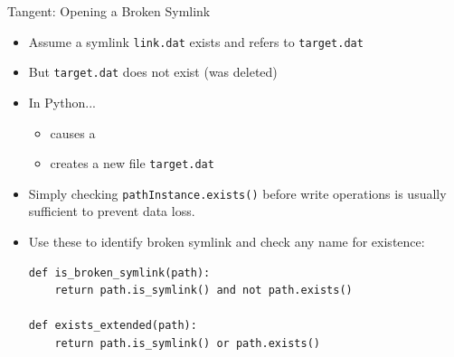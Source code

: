 \begin{frame}[fragile]{Tangent: Opening a Broken Symlink}
%
\begin{itemize}
\item Assume a symlink \texttt{link.dat} exists and refers to \texttt{target.dat}
\item But \texttt{target.dat} does not exist (was deleted)
\item In Python...
	\begin{itemize}
	\item {} causes a 
	\item {} creates a new file \texttt{target.dat}
	\end{itemize}
\item[\Thus] Simply checking \texttt{pathInstance.exists()} before write operations is usually sufficient to prevent data loss.
\item[\Thus] Use these to identify broken symlink and check any name for existence:
	\begin{verbatim}
def is_broken_symlink(path):
    return path.is_symlink() and not path.exists()
    
def exists_extended(path):
    return path.is_symlink() or path.exists()
	\end{verbatim}
\end{itemize}
%
\end{frame}



